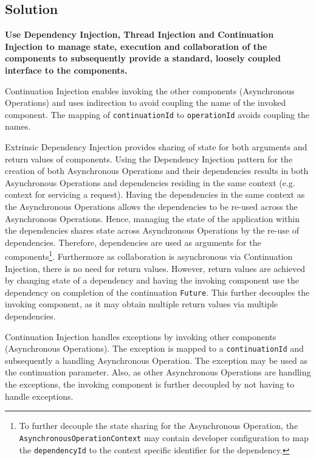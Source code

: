 \documentclass[prodmode]{style/acmlarge}
\begin{document}
\subsection{Solution}


\textbf{Use Dependency Injection, Thread Injection and Continuation Injection to manage state, execution and collaboration of the components to subsequently provide a standard, loosely coupled interface to the components.}

Continuation Injection enables invoking the other components (Asynchronous
Operations) and uses indirection to avoid coupling the name of the invoked
component.  The mapping of \texttt{continuationId} to \texttt{operationId}
avoids coupling the names.

Extrinsic Dependency Injection \cite{ioc} provides sharing of state for both
arguments and return values of components.  Using the Dependency Injection
pattern for the creation of both Asynchronous Operations and their dependencies
results in both Asynchronous Operations and dependencies residing in the same
context (e.g. context for servicing a request).  Having the dependencies in the
same context as the Asynchronous Operations allows the dependencies to be
re-used across the Asynchronous Operations.  Hence, managing the state of the
application within the dependencies shares state across Asynchronous Operations
by the re-use of dependencies.  Therefore, dependencies are used as arguments
for the components\footnote{To further decouple the state sharing for the
Asynchronous Operation, the \texttt{AsynchronousOperationContext} may contain
developer configuration to map the \texttt{dependencyId} to the context specific
identifier for the dependency.}.  Furthermore as collaboration is asynchronous
via Continuation Injection, there is no need for return values.  However, return
values are achieved by changing state of a dependency and having the invoking
component use the dependency on completion of the continuation \texttt{Future}. 
This further decouples the invoking component, as it may obtain multiple return
values via multiple dependencies.

Continuation Injection handles exceptions by invoking other components
(Asynchronous Operations). The exception is mapped to a \texttt{continuationId}
and subsequently a handling Asynchronous Operation.  The exception may be used
as the continuation parameter.  Also, as other Asynchronous Operations are
handling the exceptions, the invoking component is further decoupled by not
having to handle exceptions.
\end{document}
